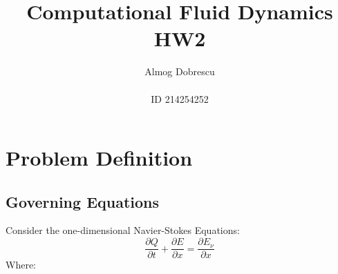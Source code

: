 \documentclass[11pt, a4paper]{article}
\title{Computational Fluid Dynamics \\ HW2}
\author{Almog Dobrescu\\\\ID 214254252}
\begin{document}
\pagestyle{empty}
\maketitle
\thispagestyle{empty}
\newpage

\tableofcontents
\vfil
\listoffigures
\newpage

\printnomenclature
\newpage

\pagestyle{fancy}
\setcounter{page}{1}
\section{Problem Definition}
\subsection{Governing Equations}
Consider the one-dimensional Navier-Stokes Equations:
\begin{equation}
    \frac{\partial Q}{\partial t}+\frac{\partial E}{\partial x}=\frac{\partial E_\nu}{\partial x}
\end{equation}
Where:
\end{document}
